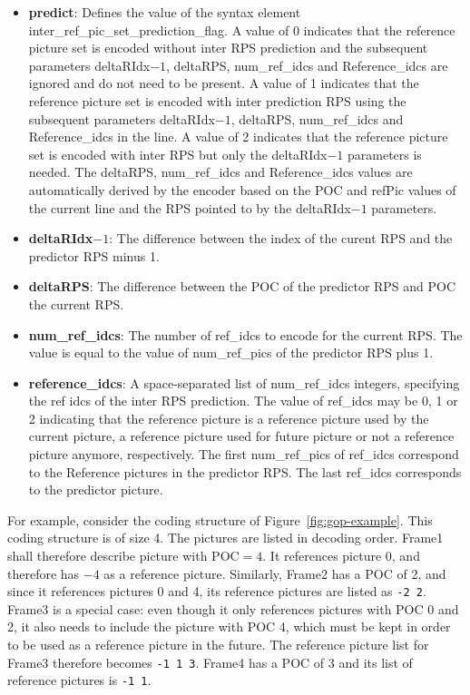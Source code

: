 \documentclass[a4paper,11pt]{jctvcdoc}
\begin{document}
\begin{itemize}
\item[]\textbf{predict}: Defines the value of the syntax element
inter_ref_pic_set_prediction_flag. A value of 0 indicates that the
reference picture set is encoded without inter RPS prediction and the
subsequent parameters deltaRIdx$-1$, deltaRPS, num_ref_idcs and
Reference_idcs are ignored and do not need to be present. A value of 1
indicates that the reference picture set is encoded with inter
prediction RPS using the subsequent parameters deltaRIdx$-1$, deltaRPS,
num_ref_idcs and Reference_idcs in the line. A value of 2 indicates that
the reference picture set is encoded with inter RPS but only the
deltaRIdx$-1$ parameters is needed. The deltaRPS, num_ref_idcs and
Reference_idcs values are automatically derived by the encoder based on
the POC and refPic values of the current line and the RPS pointed to by
the deltaRIdx$-1$ parameters.

\item[]\textbf{deltaRIdx$-1$}: The difference between the index of the
curent RPS and the predictor RPS minus 1.

\item[]\textbf{deltaRPS}: The difference between the POC of the
predictor RPS and POC the current RPS.

\item[]\textbf{num_ref_idcs}: The number of ref_idcs to encode for the
current RPS.  The value is equal to the value of  num_ref_pics of the
predictor RPS plus 1.

\item[]\textbf{reference_idcs}: A space-separated list of num_ref_idcs
integers, specifying the ref idcs of the inter RPS prediction. The value
of ref_idcs may be 0, 1 or 2 indicating that the reference picture is a
reference picture used by the current picture, a reference picture used
for future picture or not a reference picture anymore, respectively. The
first num_ref_pics of ref_idcs correspond to the Reference pictures in
the predictor RPS. The last ref_idcs corresponds to the predictor
picture.
\end{itemize}

For example, consider the coding structure of Figure~\ref{fig:gop-example}.
This coding structure is of size 4. The pictures are listed in decoding
order. Frame1 shall therefore describe picture with $\textrm{POC}=4$. It
references picture 0, and therefore has $-4$ as a reference picture.
Similarly, Frame2 has a POC of 2, and since it references pictures 0 and
4, its reference pictures are listed as \verb|-2 2|. Frame3 is a special
case: even though it only references pictures with POC 0 and 2, it also
needs to include the picture with POC 4, which must be kept in order to
be used as a reference picture in the future. The reference picture list
for Frame3 therefore becomes \verb|-1 1 3|. Frame4 has a POC of 3 and
its list of reference pictures is \verb|-1 1|.
\end{document}
